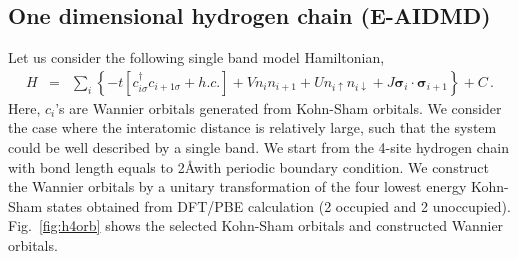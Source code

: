 \documentclass[aps, prb]{revtex4-1}
\renewcommand{\vec}[1]{\bm{#1}}
\begin{document}
\subsection{One dimensional hydrogen chain (E-AIDMD)}
Let us consider the following single band model Hamiltonian,
\begin{eqnarray}\label{eq:h4model}
H &=& \sum_{i}\left\{-t[c^{\dagger}_{i\sigma}c_{i+1\sigma} +h.c.]+ Vn_{i}n_{i+1} + Un_{i\uparrow}n_{i\downarrow}+ J\vec \sigma_{i}\cdot \vec \sigma_{i+1}\right\} + C\,.
\end{eqnarray}
Here, $c_{i}$'s are Wannier orbitals generated from Kohn-Sham orbitals. We consider the case where the interatomic distance is relatively large, such that the system could be well described by a single band.  We start from the 4-site hydrogen chain with bond length equals to 2\AA with periodic boundary condition. We construct the Wannier orbitals by a unitary transformation of the four lowest energy Kohn-Sham states obtained from DFT/PBE calculation (2 occupied and 2 unoccupied). Fig.~\ref{fig:h4orb} shows the selected Kohn-Sham orbitals and constructed Wannier orbitals. 
\end{document}
